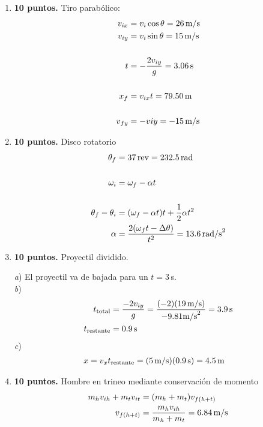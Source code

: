 \documentclass{article}
\begin{document}
\begin{enumerate}

\item \textbf{10 puntos.} Tiro parabólico:
\begin{align*}
v_{ix} &= v_{i} \cos \theta = 26 \text{\,m/s}\\
v_{iy} &= v_{i}\sin \theta = 15 \text{\,m/s}\\ \\
t &= -\frac{2v_{iy}}{g} = 3.06 \text{\,s} \\ \\
x_{f} &= v_{ix}t = 79.50 \text{\,m} \\ \\ 
v_{fy} &= -v{iy} = -15 \text{\,m/s}
\end{align*}

\item \textbf{10 puntos.} Disco rotatorio
\begin{align*}
\theta_{f} &= 37 \text{\,rev} = 232.5 \text{\,rad} \\ \\
\omega_{i} &= \omega_{f} -\alpha t \\ \\
\theta_{f} - \theta_{i} &= (\omega_{f} - \alpha t)t + \frac{1}{2}\alpha t^{2} \\
\alpha &= \frac{2(\omega_{f} t - \Delta \theta)}{t^{2}} 
= 13.6 \text{\,rad/s}^{2}
\end{align*}

\item \textbf{10 puntos.} Proyectil dividido.

\emph{a}) El proyectil va de bajada para un $t=3$\,s. \\
\emph{b}) 
\begin{align*}
t_{\text{total}} &= \frac{-2v_{iy}}{g} = 
\frac{(-2)(19\,\text{m/s})}{-9.81\text{m/s}^{2}} = 3.9\text{\,s} \\
t_{\text{restante}} &= 0.9\text{\,s}
\end{align*}
\emph{c})
\begin{align*}
x &= v_{x} t_{\text{restante}} = (5\text{\,m/s}) (0.9\text{\,s}) = 
4.5\text{\,m}
\end{align*}

\item \textbf{10 puntos.} Hombre en trineo mediante conservación de momento
\begin{align*}
m_{h} v_{ih} + m_{t} v_{it} &= (m_{h} + m_{t}) v_{f(h+t)} \\
v_{f(h+t)} &= \frac{m_{h} v_{ih}}{m_{h} + m_{t}} = 6.84\text{\,m/s}
\end{align*}


\end{enumerate}
\end{document}
